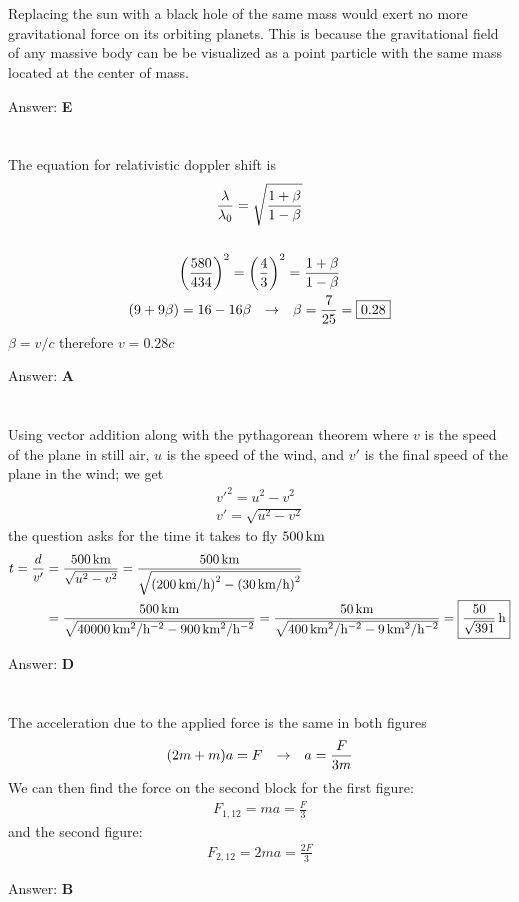 \documentclass[12pt]{article}
\newcommand{\Answer}[1]{Answer: \textbf{#1}}
\newcommand{\Problem}[3]{
    \setcounter{section}{#1}
    \addtocounter{section}{-1}
    \section{}
    #3\par\par
    \Answer{#2}
}
\begin{document}
\Problem{54}{E}{%
Replacing the sun with a black hole of the same mass would exert no more gravitational force on its orbiting planets. This is because the gravitational field of any massive body can be be visualized as a point particle with the same mass located at the center of mass.
}

\Problem{55}{A}{%
The equation for relativistic doppler shift is
\begin{gather}
\frac{\lambda}{\lambda_{0}} = \sqrt{\frac{1+\beta}{1-\beta}}\\
\nonumber\\
\left(\frac{580}{434}\right)^{2} = \left(\frac{4}{3}\right)^{2} = \frac{1+\beta}{1-\beta}\nonumber\\
(9 + 9 \beta) = 16 - 16 \beta \hspace{.1in} \rightarrow \hspace{.1in} \beta = \frac{7}{25} = \boxed{0.28}\nonumber
\end{gather}
$\beta = v/c$ therefore $v = 0.28 c$
}

\Problem{56}{D}{%
Using vector addition along with the pythagorean theorem where $v$ is the speed of the plane in still air, $u$ is the speed of the wind, and $v'$ is the final speed of the plane in the wind; we get
\begin{gather}
v'^{2} = u^{2} - v^{2}\nonumber\\
v' = \sqrt{u^{2} - v^{2}}\nonumber
\end{gather}
the question asks for the time it takes to fly $500\,\text{km}$
\begin{align}
t = \frac{d}{v'} &=
\frac{500\,\text{km}}{\sqrt{u^{2} - v^{2}}} =
\frac{500\,\text{km}}{\sqrt{\left(200\,\text{km/h}\right)^{2} - \left(30\,\text{km/h}\right)^{2}}}\nonumber\\
&= \frac{500\,\text{km}}{\sqrt{40000\,\text{km$^{2}$/h$^{-2}$} - 900\,\text{km$^{2}$/h$^{-2}$}}} =
\frac{50\,\text{km}}{\sqrt{400\,\text{km$^{2}$/h$^{-2}$} - 9\,\text{km$^{2}$/h$^{-2}$}}} = \boxed{\frac{50}{\sqrt{391}}\,\text{h}}\nonumber
\end{align}
}

\Problem{57}{B}{%
The acceleration due to the applied force is the same in both figures
\begin{align}
(2m +m)a = F \hspace{.1in} \rightarrow \hspace{.1in} a = \frac{F}{3m}\nonumber
\end{align}
We can then find the force on the second block for the first figure:
\begin{align}
F_{1,12} = ma = \boxed{\frac{F}{3}}\nonumber
\end{align}
and the second figure:
\begin{align}
F_{2,12} = 2ma = \boxed{\frac{2F}{3}}\nonumber
\end{align}
}
\end{document}
